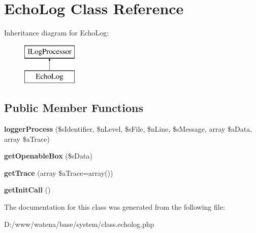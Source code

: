 \hypertarget{class_echo_log}{\section{Echo\-Log Class Reference}
\label{class_echo_log}
}
Inheritance diagram for Echo\-Log\-:\begin{figure}[H]
\begin{center}
\leavevmode
\includegraphics[height=2.000000cm]{class_echo_log}
\end{center}
\end{figure}
\subsection*{Public Member Functions}
\begin{DoxyCompactItemize}
\item 
\hypertarget{class_echo_log_aaf870d92ef7dac6aaee50b2b99efd5d6}{{\bfseries logger\-Process} (\$s\-Identifier, \$n\-Level, \$s\-File, \$n\-Line, \$s\-Message, array \$a\-Data, array \$a\-Trace)}\label{class_echo_log_aaf870d92ef7dac6aaee50b2b99efd5d6}

\item 
\hypertarget{class_echo_log_a2d4a030b8621d4f10286a1b52611d866}{{\bfseries get\-Openable\-Box} (\$s\-Data)}\label{class_echo_log_a2d4a030b8621d4f10286a1b52611d866}

\item 
\hypertarget{class_echo_log_ab59af041a3626a5e02c9bf1e127cc33f}{{\bfseries get\-Trace} (array \$a\-Trace=array())}\label{class_echo_log_ab59af041a3626a5e02c9bf1e127cc33f}

\item 
\hypertarget{class_echo_log_ad63e9950bae8e1ccc5d95dfb5658f76b}{{\bfseries get\-Init\-Call} ()}\label{class_echo_log_ad63e9950bae8e1ccc5d95dfb5658f76b}

\end{DoxyCompactItemize}


The documentation for this class was generated from the following file\-:\begin{DoxyCompactItemize}
\item 
D\-:/www/watena/base/system/class.\-echolog.\-php\end{DoxyCompactItemize}
